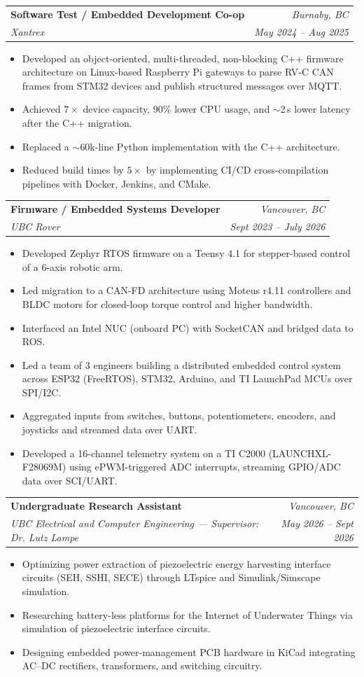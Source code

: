 \documentclass[letterpaper,11pt]{article}
\makeatletter
\newcommand{\resumeItem}[1]{
  \item\small{
    {#1 \vspace{-2pt}}
  }
}
\newcommand{\resumeSubheading}[4]{
  \vspace{-2pt}\item
    \begin{tabular*}{0.97\textwidth}[t]{l@{\extracolsep{\fill}}r}
      \textbf{#1} & \textit{\small #4} \\
      \textit{\small#3} & \textit{\small #2} \\
    \end{tabular*}\vspace{-7pt}
}
\newcommand{\resumeItemListStart}{\begin{itemize}[leftmargin=0.2in]}
\newcommand{\resumeItemListEnd}{\end{itemize}\vspace{-5pt}}
\makeatother
\begin{document}
\resumeSubheading
      {Software Test / Embedded Development Co-op}{May 2024 -- Aug 2025}
      {Xantrex}{Burnaby, BC}
      \resumeItemListStart
        \resumeItem{Developed an object-oriented, multi-threaded, non-blocking C++ firmware architecture on Linux-based Raspberry Pi gateways to parse RV-C CAN frames from STM32 devices and publish structured messages over MQTT.}
        \resumeItem{Achieved $7\times$ device capacity, 90\% lower CPU usage, and $\sim$2\,s lower latency after the C++ migration.}
        \resumeItem{Replaced a $\sim$60k-line Python implementation with the C++ architecture.}
        \resumeItem{Reduced build times by $5\times$ by implementing CI/CD cross-compilation pipelines with Docker, Jenkins, and CMake.}
      \resumeItemListEnd

    \resumeSubheading
      {Firmware / Embedded Systems Developer}{Sept 2023 -- July 2026}
      {UBC Rover}{Vancouver, BC}
      \resumeItemListStart
        \resumeItem{Developed Zephyr RTOS firmware on a Teensy 4.1 for stepper-based control of a 6-axis robotic arm.}
        \resumeItem{Led migration to a CAN-FD architecture using Moteus r4.11 controllers and BLDC motors for closed-loop torque control and higher bandwidth.}
        \resumeItem{Interfaced an Intel NUC (onboard PC) with SocketCAN and bridged data to ROS.}
        \resumeItem{Led a team of 3 engineers building a distributed embedded control system across ESP32 (FreeRTOS), STM32, Arduino, and TI LaunchPad MCUs over SPI/I2C.}
        \resumeItem{Aggregated inputs from switches, buttons, potentiometers, encoders, and joysticks and streamed data over UART.}
        \resumeItem{Developed a 16-channel telemetry system on a TI C2000 (LAUNCHXL-F28069M) using ePWM-triggered ADC interrupts, streaming GPIO/ADC data over SCI/UART.}
      \resumeItemListEnd

    \resumeSubheading
      {Undergraduate Research Assistant}{May 2026 -- Sept 2026}
      {UBC Electrical and Computer Engineering --- Supervisor: Dr. Lutz Lampe}{Vancouver, BC}
      \resumeItemListStart
        \resumeItem{Optimizing power extraction of piezoelectric energy harvesting interface circuits (SEH, SSHI, SECE) through LTspice and Simulink/Simscape simulation.}
        \resumeItem{Researching battery-less platforms for the Internet of Underwater Things via simulation of piezoelectric interface circuits.}
        \resumeItem{Designing embedded power-management PCB hardware in KiCad integrating AC--DC rectifiers, transformers, and switching circuitry.}
      \resumeItemListEnd
\end{document}
